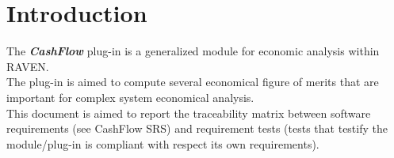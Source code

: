 \section{Introduction}
The \textbf{\textit{CashFlow}} plug-in is a generalized module for economic analysis within RAVEN.
\\The plug-in is aimed to compute several economical figure of merits that are important for complex
system economical analysis.
\\This document is aimed to report the traceability matrix between software requirements
(see CashFlow SRS) and requirement tests (tests that testify the module/plug-in is compliant
with respect its own requirements).
